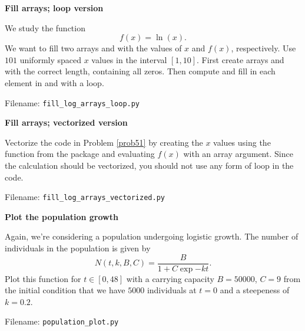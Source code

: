 
\begin{Problem}{\textbf{Fill arrays; loop version}} \label{prob51}

\noindent We study the function
\begin{equation*}
f(x) = \ln(x).
\end{equation*}
We want to fill two arrays  and  with the values of $x$ and $f(x)$,
respectively. Use $101$ uniformly spaced $x$ values in the interval $[1, 10]$.
First create arrays  and  with the correct length, containing
all zeros. Then compute and fill in each element in
 and  with a  loop.

Filename: \texttt{fill\_log\_arrays\_loop.py}
\end{Problem}

\begin{Problem}{\textbf{Fill arrays; vectorized version}}

\noindent Vectorize the code in Problem \ref{prob51} by creating the $x$ values using the
 function from the  package and evaluating
$f(x)$ with an array argument. Since the calculation should be vectorized, you should not
use any form of loop in the code.

Filename: \texttt{fill\_log\_arrays\_vectorized.py}
\end{Problem}



\begin{Problem}{\textbf{Plot the population growth}}

\noindent Again, we're considering a population undergoing logistic growth. The number of
individuals in the population is given by
\begin{equation*}
N(t, k, B, C) = \frac{B}{1 + C \exp{-kt}}.
\end{equation*}
Plot this function for $t \in [0, 48]$ with a carrying capacity $B = 50 000$,
$C = 9$ from the initial condition that we have $5 000$ individuals at $t = 0$
and a steepeness of $k = 0.2$.

Filename: \texttt{population\_plot.py}
\end{Problem}

